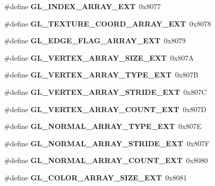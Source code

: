 \begin{DoxyCompactItemize}
\item 
\#define {\bfseries G\+L\+\_\+\+I\+N\+D\+E\+X\+\_\+\+A\+R\+R\+A\+Y\+\_\+\+E\+X\+T}~0x8077\label{_s_d_l__opengl_8h_a44c06b225b7d8130be69560be3a59fd5}

\item 
\#define {\bfseries G\+L\+\_\+\+T\+E\+X\+T\+U\+R\+E\+\_\+\+C\+O\+O\+R\+D\+\_\+\+A\+R\+R\+A\+Y\+\_\+\+E\+X\+T}~0x8078\label{_s_d_l__opengl_8h_a1a0bb3b3f8a3a01cb0773014052edfa2}

\item 
\#define {\bfseries G\+L\+\_\+\+E\+D\+G\+E\+\_\+\+F\+L\+A\+G\+\_\+\+A\+R\+R\+A\+Y\+\_\+\+E\+X\+T}~0x8079\label{_s_d_l__opengl_8h_a4444cf3102bcf14257bc2610e20e4826}

\item 
\#define {\bfseries G\+L\+\_\+\+V\+E\+R\+T\+E\+X\+\_\+\+A\+R\+R\+A\+Y\+\_\+\+S\+I\+Z\+E\+\_\+\+E\+X\+T}~0x807\+A\label{_s_d_l__opengl_8h_a2d157b984cd5304d016430a028f52f32}

\item 
\#define {\bfseries G\+L\+\_\+\+V\+E\+R\+T\+E\+X\+\_\+\+A\+R\+R\+A\+Y\+\_\+\+T\+Y\+P\+E\+\_\+\+E\+X\+T}~0x807\+B\label{_s_d_l__opengl_8h_ad33f940bd8cb0e14b9e3c058a788c109}

\item 
\#define {\bfseries G\+L\+\_\+\+V\+E\+R\+T\+E\+X\+\_\+\+A\+R\+R\+A\+Y\+\_\+\+S\+T\+R\+I\+D\+E\+\_\+\+E\+X\+T}~0x807\+C\label{_s_d_l__opengl_8h_add069b4723b79d4807c6a0c5321ef25e}

\item 
\#define {\bfseries G\+L\+\_\+\+V\+E\+R\+T\+E\+X\+\_\+\+A\+R\+R\+A\+Y\+\_\+\+C\+O\+U\+N\+T\+\_\+\+E\+X\+T}~0x807\+D\label{_s_d_l__opengl_8h_a69bca0f4a2384c6c510bfe3237df7f39}

\item 
\#define {\bfseries G\+L\+\_\+\+N\+O\+R\+M\+A\+L\+\_\+\+A\+R\+R\+A\+Y\+\_\+\+T\+Y\+P\+E\+\_\+\+E\+X\+T}~0x807\+E\label{_s_d_l__opengl_8h_a7f0b3bae5197df86f6d57146668a42ec}

\item 
\#define {\bfseries G\+L\+\_\+\+N\+O\+R\+M\+A\+L\+\_\+\+A\+R\+R\+A\+Y\+\_\+\+S\+T\+R\+I\+D\+E\+\_\+\+E\+X\+T}~0x807\+F\label{_s_d_l__opengl_8h_a7f0cac7197914dca1568adf3f2b4a36a}

\item 
\#define {\bfseries G\+L\+\_\+\+N\+O\+R\+M\+A\+L\+\_\+\+A\+R\+R\+A\+Y\+\_\+\+C\+O\+U\+N\+T\+\_\+\+E\+X\+T}~0x8080\label{_s_d_l__opengl_8h_a4a18c98d7e16648833f78116a7be9826}

\item 
\#define {\bfseries G\+L\+\_\+\+C\+O\+L\+O\+R\+\_\+\+A\+R\+R\+A\+Y\+\_\+\+S\+I\+Z\+E\+\_\+\+E\+X\+T}~0x8081\label{_s_d_l__opengl_8h_ab35f9ed698bfcdf369cfa6c8fcb15ec2}


\end{DoxyCompactItemize}
